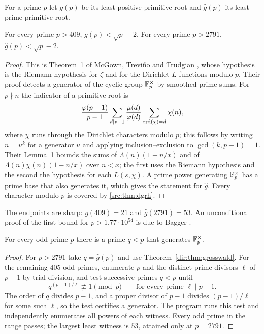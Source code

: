 For a prime $p$ let $g(p)$ be its least positive primitive root and $\widehat g(p)$ its
least prime primitive root.

\begin{theorem}\label{dir:thm:grosswald}
For every prime $p>409$, $g(p)<\sqrt p-2$. For every prime $p>2791$,
$\widehat g(p)<\sqrt p-2$.
\end{theorem}

\begin{proof}
This is Theorem~1 of McGown, Trevi\~no and Trudgian
\cite{McGownTrevinoTrudgian2016Resolving}, whose hypothesis is the Riemann hypothesis
for $\zeta$ and for the Dirichlet $L$-functions modulo $p$. Their proof detects a
generator of the cyclic group $\mathbb{F}_p^\times$ by smoothed prime sums. For $p\nmid n$ the
indicator of a primitive root is
\[
 \frac{\varphi(p-1)}{p-1}\sum_{d\mid p-1}\frac{\mu(d)}{\varphi(d)}
 \sum_{\operatorname{ord}(\chi)=d}\chi(n),
\]
where $\chi$ runs through the Dirichlet characters modulo $p$; this follows by writing
$n=u^k$ for a generator $u$ and applying inclusion--exclusion to $\gcd(k,p-1)=1$.
Their Lemma~1 bounds the sums of $\Lambda(n)(1-n/x)$ and of $\Lambda(n)\chi(n)(1-n/x)$
over $n<x$; the first uses the Riemann hypothesis and the second the hypothesis for
each $L(s,\chi)$. A prime power generating $\mathbb{F}_p^\times$ has a prime base that also
generates it, which gives the statement for $\widehat g$. Every character modulo $p$
is covered by \cref{src:thm:dgrh}.
\end{proof}

The endpoints are sharp: $g(409)=21$ and $\widehat g(2791)=53$. An unconditional proof
of the first bound for $p>1.77\cdot10^{54}$ is due to Bagger \cite{Bagger2026Note}.

\begin{corollary}\label{dir:cor:erdos985}
For every odd prime $p$ there is a prime $q<p$ that generates $\mathbb{F}_p^\times$.
\end{corollary}

\begin{proof}
For $p>2791$ take $q=\widehat g(p)$ and use Theorem~\ref{dir:thm:grosswald}. For the remaining
$405$ odd primes, enumerate $p$ and the distinct prime divisors $\ell$ of $p-1$ by trial
division, and test successive primes $q<p$ until
\[
 q^{(p-1)/\ell}\not\equiv1\pmod p\qquad\text{for every prime }\ell\mid p-1 .
\]
The order of $q$ divides $p-1$, and a proper divisor of $p-1$ divides $(p-1)/\ell$ for
some such $\ell$, so the test certifies a generator. The program
 runs this test and
independently enumerates all powers of each witness. Every odd prime in the range
passes; the largest least witness is $53$, attained only at $p=2791$.
\end{proof}

